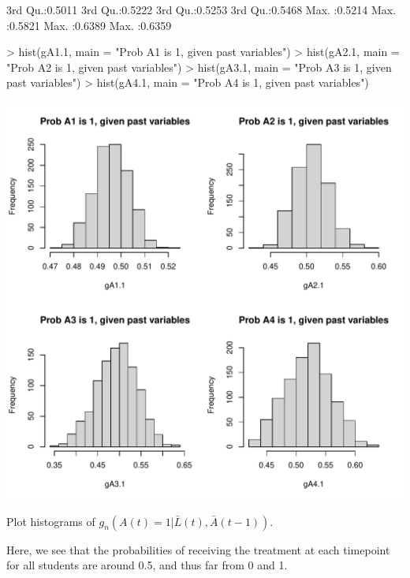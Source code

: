 \documentclass{exam}
\newenvironment{myfigure}{\captionsetup{type=mytype}}{}
\begin{document}
\begin{enumerate}
\begin{solution}
\begin{Schunk}
\begin{Soutput}
 3rd Qu.:0.5011   3rd Qu.:0.5222   3rd Qu.:0.5253   3rd Qu.:0.5468  
 Max.   :0.5214   Max.   :0.5821   Max.   :0.6389   Max.   :0.6359  
\end{Soutput}
\begin{Sinput}
> hist(gA1.1, main = "Prob A1 is 1, given past variables")
> hist(gA2.1, main = "Prob A2 is 1, given past variables")
> hist(gA3.1, main = "Prob A3 is 1, given past variables")
> hist(gA4.1, main = "Prob A4 is 1, given past variables")
\end{Sinput}
\end{Schunk}
\begin{myfigure}
\begin{center}
\includegraphics[width=.4\textwidth]{g1Hist2.pdf}
\caption{Plot histograms of $g_n(A(t) = 1|\bar{L}(t), \bar{A}(t-1))$.}
\label{Fig:g1Hist2}
\end{center}
\end{myfigure}

Here, we see that the probabilities of receiving the treatment at each timepoint for all students are around 0.5, and thus far from 0 and 1.


\end{solution}
\end{enumerate}
\end{document}
